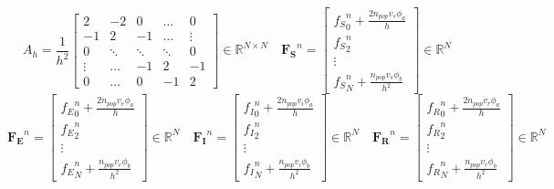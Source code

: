 \documentclass[serif]{beamer}
\newcommand{\R}{\mathbb{R}}
\begin{document}
\begin{frame}
\begin{tiny}
\begin{equation*}
A_h= \frac{1}{h^2} \begin{bmatrix}
2 & -2 & 0 & \dots & 0 \\
-1 & 2 & -1 & \dots & \vdots\\
0 & \ddots & \ddots & \ddots & 0 \\
\vdots& \dots & -1& 2& -1 \\
0 & \dots & 0& -1 & 2
\end{bmatrix} \in \R^{N \times N} 
\quad
\mathbf{F_S}^n = \begin{bmatrix} {f_S}_0^n + \frac{2 n_{pop} v_s \phi_a}{h}\\ {f_S}_2^n \\ \vdots \\ {f_S}_N^n + \frac{n_{pop} v_s \phi_b}{h^2} \end{bmatrix} \in \R^N 
\end{equation*}
\begin{equation*}
\mathbf{F_E}^n = \begin{bmatrix} {f_E}_0^n + \frac{2 n_{pop} v_e \phi_a}{h}\\ {f_E}_2^n \\ \vdots \\ {f_E}_N^n + \frac{n_{pop} v_e \phi_b}{h^2} \end{bmatrix}\in \R^N \quad
\mathbf{F_I}^n =\begin{bmatrix} {f_I}_0^n + \frac{2 n_{pop} v_i \phi_a}{h}\\ {f_I}_2^n \\ \vdots \\ {f_I}_N^n + \frac{n_{pop} v_i \phi_b}{h^2}\end{bmatrix} \in \R^N \quad
\mathbf{F_R}^n =\begin{bmatrix} {f_R}_0^n +  \frac{2 n_{pop} v_r \phi_a}{h} \\ {f_R}_2^n \\ \vdots \\ {f_R}_N^n + \frac{n_{pop} v_r \phi_b}{h^2}\end{bmatrix} \in \R^N 
\end{equation*}
\end{tiny}
\end{frame}
\end{document}
